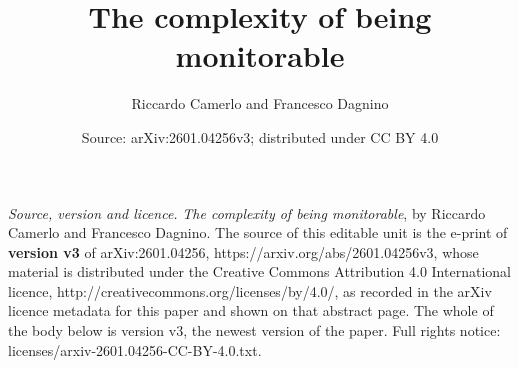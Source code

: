 \documentclass[10pt,a4paper]{amsart}
\begin{document}
\title{The complexity of being monitorable}
\author{Riccardo Camerlo and Francesco Dagnino}
\date{Source: arXiv:2601.04256v3; distributed under CC BY 4.0}
\maketitle
\noindent\emph{Source, version and licence.} \emph{The complexity of being monitorable}, by Riccardo Camerlo and Francesco Dagnino. The source of this editable unit is the e-print of \textbf{version v3} of arXiv:2601.04256, https://arxiv.org/abs/2601.04256v3, whose material is distributed under the Creative Commons Attribution 4.0 International licence, http://creativecommons.org/licenses/by/4.0/, as recorded in the arXiv licence metadata for this paper and shown on that abstract page. The whole of the body below is version v3, the newest version of the paper. Full rights notice: licenses/arxiv-2601.04256-CC-BY-4.0.txt.\par\smallskip
\end{document}
